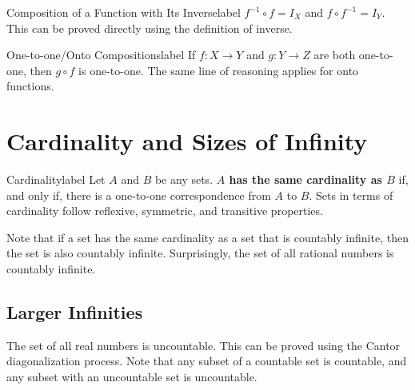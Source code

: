 \documentclass[a4paper]{report}
\begin{document}
\begin{theorem}{Composition of a Function with Its Inverse}{label}
    $f^{-1} \circ f = I_X$ and $f \circ f^{-1} = I_Y$. This can be proved directly using the
    definition of inverse.
\end{theorem}

\begin{theorem}{One-to-one/Onto Compositions}{label}
    If $f: X \to Y$ and $g: Y \to Z$ are both one-to-one, then $g \circ f$ is one-to-one.
    The same line of reasoning applies for onto functions.
\end{theorem}

\section{Cardinality and Sizes of Infinity}

\begin{definition}{Cardinality}{label}
    Let $A$ and $B$ be any sets. \textbf{$A$ has the same cardinality as $B$} if, and only if, there is
    a one-to-one correspondence from $A$ to $B$. Sets in terms of cardinality follow reflexive,
    symmetric, and transitive properties.
\end{definition}

Note that if a set has the same cardinality as a set that is countably infinite, then the set is
also countably infinite. Surprisingly, the set of all rational numbers is countably infinite.

\subsection{Larger Infinities}

The set of all real numbers is uncountable. This can be proved using the Cantor diagonalization process.
Note that any subset of a countable set is countable, and any subset with an uncountable set is uncountable.
\end{document}
